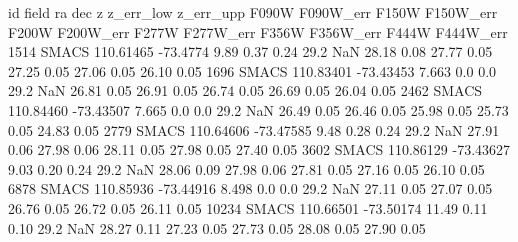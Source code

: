 
id field ra dec z z_err_low z_err_upp F090W F090W_err F150W F150W_err F200W F200W_err F277W F277W_err F356W F356W_err F444W F444W_err
1514 SMACS   110.61465    -73.4774     9.89  0.37    0.24             29.2 NaN      28.18  0.08      27.77  0.05      27.25  0.05      27.06  0.05      26.10  0.05
1696 SMACS   110.83401    -73.43453    7.663 0.0 0.0          29.2  NaN     26.81  0.05      26.91  0.05      26.74  0.05      26.69  0.05      26.04  0.05
2462 SMACS   110.84460    -73.43507    7.665 0.0 0.0          29.2  NaN    26.49  0.05      26.46  0.05      25.98  0.05      25.73  0.05      24.83  0.05
2779 SMACS   110.64606    -73.47585     9.48  0.28    0.24          29.2  NaN    27.91  0.06      27.98  0.06      28.11  0.05      27.98  0.05      27.40  0.05
3602 SMACS   110.86129    -73.43627     9.03  0.20    0.24           29.2  NaN    28.06  0.09      27.98  0.06      27.81  0.05      27.16  0.05      26.10  0.05
6878 SMACS   110.85936    -73.44916     8.498 0.0 0.0              29.2 NaN     27.11  0.05      27.07  0.05      26.76  0.05      26.72  0.05      26.11  0.05
10234 SMACS  110.66501    -73.50174     11.49  0.11    0.10        29.2 NaN     28.27  0.11      27.23  0.05      27.73  0.05      28.08  0.05      27.90  0.05
